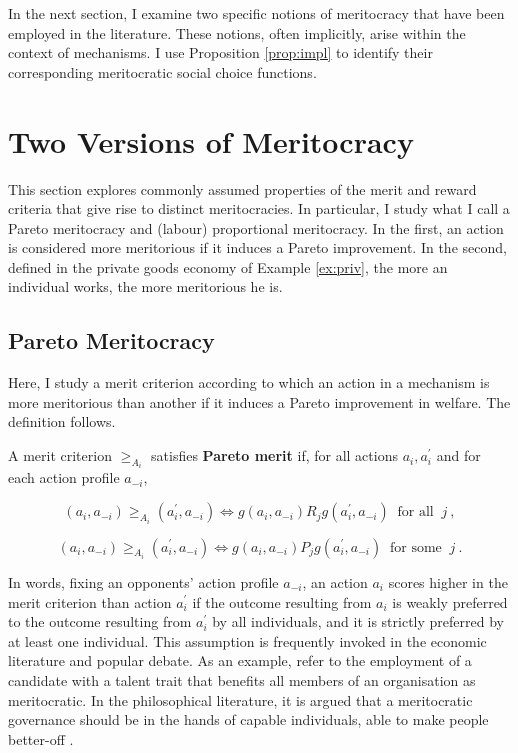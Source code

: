 In the next section, I examine two specific notions of meritocracy that have been employed in the literature. These notions, often implicitly, arise within the context of mechanisms. I use Proposition \ref{prop:impl} to identify their corresponding meritocratic social choice functions.

\section{Two Versions of Meritocracy}\label{sec:priv}

This section explores commonly assumed properties of the merit and reward criteria that give rise to distinct meritocracies. In particular, I study what I call a Pareto meritocracy and (labour) proportional meritocracy. In the first, an action is considered more meritorious if it induces a Pareto improvement. In the second, defined in the private goods economy of Example \ref{ex:priv}, the more an individual works, the more meritorious he is.

\subsection{Pareto Meritocracy}\label{subsec:pareto}

Here, I study a merit criterion according to which an action in a mechanism is more meritorious than another if it induces a Pareto improvement in welfare. The definition follows.

\begin{definition}\label{def:pareto}
	A merit criterion \( \geq_{A_i} \) satisfies \textbf{Pareto merit} if, for all actions \( a_i, a_i^{\prime} \) and for each action profile \( a_{-i} \),

	\[ ( a_i, a_{-i} ) \geq_{A_i} ( a^{\prime}_i, a_{-i} ) \iff g ( a_i, a_{-i} ) R_j  g ( a^{\prime}_i, a_{-i} ) \: \text{ for all } \: j \: , \]

	\[ ( a_i, a_{-i} ) \geq_{A_i} ( a^{\prime}_i, a_{-i} ) \iff g ( a_i, a_{-i} ) P_j  g ( a^{\prime}_i, a_{-i} ) \: \text{ for some } \: j \: .\]
\end{definition}

In words, fixing an opponents' action profile \( a_{-i} \), an action \( a_i \) scores higher in the merit criterion than action \( a^{\prime}_{i} \) if the outcome resulting from \( a_i \) is weakly preferred to the outcome resulting from \( a^{\prime}_{i} \) by all individuals, and it is strictly preferred by at least one individual. This assumption is frequently invoked in the economic literature and popular debate. As an example, \cite{moissonCooptationMeritocracyVs2024} refer to the employment of a candidate with a talent trait that benefits all members of an organisation as meritocratic. In the philosophical literature, it is argued that a meritocratic governance should be in the hands of capable individuals, able to make people better-off \citep{sep-meritocracy}.

